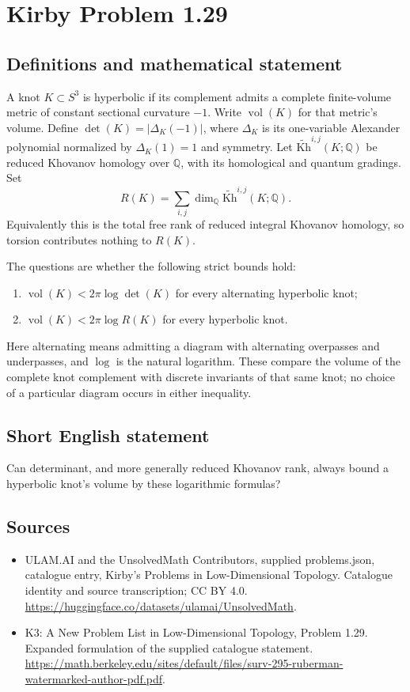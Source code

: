 \documentclass[11pt,a4paper]{article}
\begin{document}
\section*{Kirby Problem 1.29}\label{statement}

\subsection{Definitions and mathematical statement}
A knot $K\subset S^3$ is hyperbolic if its complement admits a complete
finite-volume metric of constant sectional curvature $-1$. Write
$\operatorname{vol}(K)$ for that metric's volume. Define
$\det(K)=|\Delta_K(-1)|$, where $\Delta_K$ is its one-variable Alexander
polynomial normalized by $\Delta_K(1)=1$ and symmetry.
Let $\widetilde{\mathrm{Kh}}^{i,j}(K;\mathbb Q)$ be reduced Khovanov homology
over $\mathbb Q$, with its homological and quantum gradings. Set
\[
R(K)=\sum_{i,j}\dim_{\mathbb Q}\widetilde{\mathrm{Kh}}^{i,j}(K;\mathbb Q).
\]
Equivalently this is the total free rank of reduced integral Khovanov homology,
so torsion contributes nothing to $R(K)$.

The questions are whether the following strict bounds hold:
\begin{enumerate}
\item $\operatorname{vol}(K)<2\pi\log\det(K)$ for every alternating hyperbolic knot;
\item $\operatorname{vol}(K)<2\pi\log R(K)$ for every hyperbolic knot.
\end{enumerate}
Here alternating means admitting a diagram with alternating overpasses and
underpasses, and $\log$ is the natural logarithm. These compare the volume of
the complete knot complement with discrete invariants of that same knot;
no choice of a particular diagram occurs in either inequality.
\subsection{Short English statement}
Can determinant, and more generally reduced Khovanov rank, always bound a hyperbolic knot's volume by these logarithmic formulas?
\subsection{Sources}
\begin{itemize}
\item[S1] ULAM.AI and the UnsolvedMath Contributors, supplied problems.json, catalogue entry, Kirby's Problems in Low-Dimensional Topology. Catalogue identity and source transcription; CC BY 4.0.
\url{https://huggingface.co/datasets/ulamai/UnsolvedMath}.
\item[S2] K3: A New Problem List in Low-Dimensional Topology, Problem 1.29. Expanded formulation of the supplied catalogue statement.
\url{https://math.berkeley.edu/sites/default/files/surv-295-ruberman-watermarked-author-pdf.pdf}.
\end{itemize}
\end{document}

